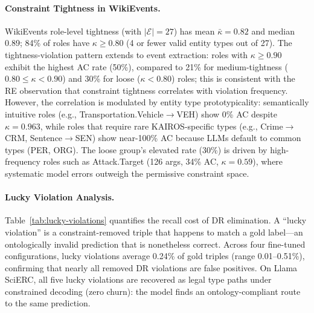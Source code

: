 \paragraph{Constraint Tightness in WikiEvents.}
\label{app:wikievents-kappa}
WikiEvents role-level tightness (with $|\mathcal{E}|{=}27$) has mean $\bar{\kappa}{=}0.82$ and median 0.89; 84\% of roles have $\kappa \geq 0.80$ (4 or fewer valid entity types out of 27).
The tightness-violation pattern extends to event extraction: roles with $\kappa \geq 0.90$ exhibit the highest AC rate (50\%), compared to 21\% for medium-tightness ($0.80 \leq \kappa < 0.90$) and 30\% for loose ($\kappa < 0.80$) roles; this is consistent with the RE observation that constraint tightness correlates with violation frequency.
However, the correlation is modulated by entity type prototypicality: semantically intuitive roles (e.g., Transportation.Vehicle$\to$VEH) show 0\% AC despite $\kappa{=}0.963$, while roles that require rare KAIROS-specific types (e.g., Crime$\to$CRM, Sentence$\to$SEN) show near-100\% AC because LLMs default to common types (PER, ORG).
The loose group's elevated rate (30\%) is driven by high-frequency roles such as Attack.Target (126 args, 34\% AC, $\kappa{=}0.59$), where systematic model errors outweigh the permissive constraint space.


\paragraph{Lucky Violation Analysis.}
\label{app:lucky-violations}
Table~\ref{tab:lucky-violations} quantifies the recall cost of DR elimination.
A ``lucky violation'' is a constraint-removed triple that happens to match a gold label---an ontologically invalid prediction that is nonetheless correct.
Across four fine-tuned configurations, lucky violations average 0.24\% of gold triples (range 0.01--0.51\%), confirming that nearly all removed DR violations are false positives.
On Llama SciERC, all five lucky violations are recovered as legal type paths under constrained decoding (zero churn): the model finds an ontology-compliant route to the same prediction.

